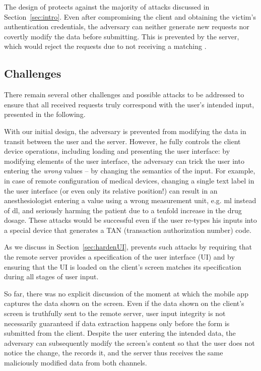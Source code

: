 The design of \sysname protects against the majority of attacks discussed in Section~\ref{sec:intro}.
Even after compromising the client and obtaining the victim's authentication credentials, the adversary can neither generate new requests nor covertly modify the data before submitting.
This is prevented by the server, which would reject the requests due to not receiving a matching \POI.


\subsection{Challenges}
\label{integriscreen:sec:systemDesign:challenger}

There remain several other challenges and possible attacks to be addressed to ensure that all received requests truly correspond with the user's intended input, presented in the following.

With our initial design, the adversary is prevented from modifying the data in transit between the user and the server.
However, he fully controls the client device operations, including loading and presenting the user interface: by modifying elements of the user interface, the adversary can trick the user into entering the \textit{wrong} values -- by changing the semantics of the input.
For example, in case of remote configuration of medical devices, changing a single text label in the user interface (or even only its relative position!) can result in an anesthesiologist entering a value using a wrong measurement unit, e.g. ml instead of dl, and seriously harming the patient due to a tenfold increase in the drug dosage.
These attacks would be successful even if the user re-types his inputs into a special device that generates a TAN (transaction authorization number) code.

As we discuss in Section~\ref{sec:hardenUI}, \sysname prevents such attacks by requiring that the remote server provides a specification of the user interface (UI) and by ensuring that the UI is loaded on the client's screen matches its specification during all stages of user input.


So far, there was no explicit discussion of the moment at which the mobile app captures the data shown on the screen.
Even if the data shown on the client's screen is truthfully sent to the remote server, user input integrity is not necessarily guaranteed if data extraction happens only before the form is submitted from the client.
Despite the user entering the intended data, the adversary can subsequently modify the screen's content so that the user does not notice the change, the \app records it, and the server thus receives the same maliciously modified data from both channels.

